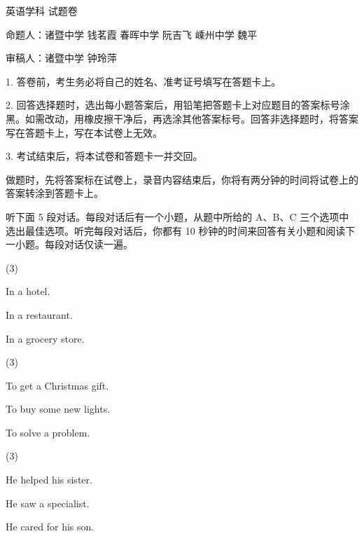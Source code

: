 \documentclass{英语试卷}
\begin{document}
\par 英语学科 试题卷\par
\par 命题人：诸暨中学 钱茗霞 春晖中学 阮吉飞 嵊州中学 魏平\par
\par 审稿人：诸暨中学 钟玲萍\par
\begin{notice}
\par 1. 答卷前，考生务必将自己的姓名、准考证号填写在答题卡上。\par
\par 2. 回答选择题时，选出每小题答案后，用铅笔把答题卡上对应题目的答案标号涂黑。如需改动，用橡皮擦干净后，再选涂其他答案标号。回答非选择题时，将答案写在答题卡上，写在本试卷上无效。\par
\par 3. 考试结束后，将本试卷和答题卡一并交回。\par
\end{notice}
\par 做题时，先将答案标在试卷上，录音内容结束后，你将有两分钟的时间将试卷上的答案转涂到答题卡上。\par
{}
\par 听下面 5 段对话。每段对话后有一个小题，从题中所给的 A、B、C 三个选项中选出最佳选项。听完每段对话后，你都有 10 秒钟的时间来回答有关小题和阅读下一小题。每段对话仅读一遍。\par
{}
\begin{choices}(3)
  \item In a hotel.
  \item In a restaurant.
  \item In a grocery store.
\end{choices}
\begin{choices}(3)
  \item To get a Christmas gift.
  \item To buy some new lights.
  \item To solve a problem.
\end{choices}
\begin{choices}(3)
  \item He helped his sister.
  \item He saw a specialist.
  \item He cared for his son.
\end{choices}
\end{document}
